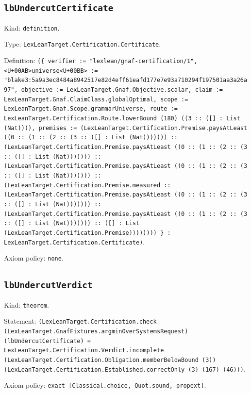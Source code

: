 \documentclass[11pt]{article}
\begin{document}
\subsection*{\texttt{lbUndercutCertificate}}
\noindent Kind: \texttt{definition}.\par
\noindent Type: \texttt{LexLeanTarget.Certification.Certificate}.\par
\noindent Definition: \texttt{(\{ verifier := "lexlean/gnaf-certification/1", <U+00AB>universe<U+00BB> := "blake3:5a9a3ec8484a8942517e82d4eff61eafd177e7e93a710294f197501aa3a26a97", objective := LexLeanTarget.Gnaf.Objective.scalar, claim := LexLeanTarget.Gnaf.ClaimClass.globalOptimal, scope := LexLeanTarget.Gnaf.Scope.grammarUniverse, route := LexLeanTarget.Certification.Route.lowerBound (180) ((3 :: ([] : List (Nat)))), premises := (LexLeanTarget.Certification.Premise.paysAtLeast ((0 :: (1 :: (2 :: (3 :: ([] : List (Nat))))))) :: (LexLeanTarget.Certification.Premise.paysAtLeast ((0 :: (1 :: (2 :: (3 :: ([] : List (Nat))))))) :: (LexLeanTarget.Certification.Premise.paysAtLeast ((0 :: (1 :: (2 :: (3 :: ([] : List (Nat))))))) :: (LexLeanTarget.Certification.Premise.measured :: (LexLeanTarget.Certification.Premise.paysAtLeast ((0 :: (1 :: (2 :: (3 :: ([] : List (Nat))))))) :: (LexLeanTarget.Certification.Premise.paysAtLeast ((0 :: (1 :: (2 :: (3 :: ([] : List (Nat))))))) :: ([] : List (LexLeanTarget.Certification.Premise)))))))) \} : LexLeanTarget.Certification.Certificate)}.\par
\noindent Axiom policy: \texttt{none}.\par
\subsection*{\texttt{lbUndercutVerdict}}
\noindent Kind: \texttt{theorem}.\par
\noindent Statement: \texttt{(LexLeanTarget.Certification.check (LexLeanTarget.GnafFixtures.argminOverSystemsRequest) (lbUndercutCertificate) = LexLeanTarget.Certification.Verdict.incomplete (LexLeanTarget.Certification.Obligation.memberBelowBound (3)) (LexLeanTarget.Certification.Established.correctOnly (3) (167) (46)))}.\par
\noindent Axiom policy: \texttt{exact [Classical.choice, Quot.sound, propext]}.\par
\end{document}
